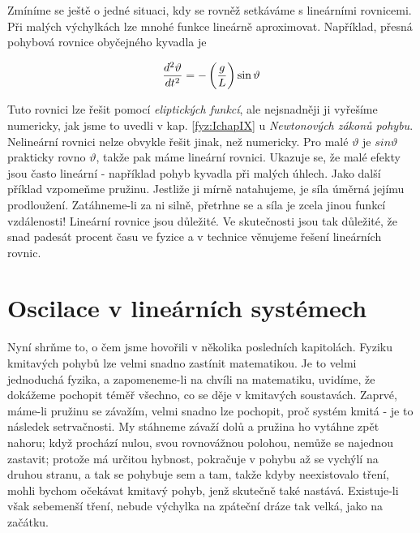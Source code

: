 {    Zmíníme se ještě o jedné situaci, kdy se rovněž setkáváme s lineárními rovnicemi. Při malých 
    výchylkách lze mnohé funkce lineárně aproximovat. Například, přesná pohybová rovnice obyčejného 
    kyvadla je
    
    \begin{equation}\label{fyz:eq346}
      \dfrac{d^2 \vartheta}{d t^2} = - \left(\dfrac{g}{L}\right)\sin\vartheta
    \end{equation}
    
    Tuto rovnici lze řešit pomocí \emph{eliptických funkcí}, ale nejsnadněji ji vyřešíme numericky, 
    jak jsme to uvedli v kap. \ref{fyz:IchapIX} u \emph{Newtonových zákonů pohybu}. Nelineární 
    rovnici nelze obvykle řešit jinak, než numericky. Pro malé \(\vartheta\) je \(sin\vartheta\) 
    prakticky rovno \(\vartheta\), takže pak máme lineární rovnici. Ukazuje se, že malé efekty jsou 
    často lineární - například pohyb kyvadla při malých úhlech. Jako další příklad vzpomeňme 
    pružinu. Jestliže ji mírně natahujeme, je síla úměrná jejímu prodloužení. Zatáhneme-li za ni 
    silně, přetrhne se a síla je zcela jinou funkcí vzdálenosti! Lineární rovnice jsou důležité. Ve 
    skutečnosti jsou tak důležité, že snad padesát procent času ve fyzice a v technice věnujeme 
    řešení lineárních rovnic.
    
  \section{Oscilace v lineárních systémech}\label{fyz:IchapXXVsecIII}
    Nyní shrňme to, o čem jsme hovořili v několika posledních kapitolách. Fyziku kmitavých pohybů 
    lze velmi snadno zastínit matematikou. Je to velmi jednoduchá fyzika, a zapomeneme-li na chvíli 
    na matematiku, uvidíme, že dokážeme pochopit téměř všechno, co se děje v kmitavých soustavách. 
    Zaprvé, máme-li pružinu se závažím, velmi snadno lze pochopit, proč systém kmitá - je to 
    následek setrvačnosti. My stáhneme závaží dolů a pružina ho vytáhne zpět nahoru; když prochází 
    nulou, svou rovnovážnou polohou, nemůže se najednou zastavit; protože má určitou hybnost, 
    pokračuje v pohybu až se vychýlí na druhou stranu, a tak se pohybuje sem a tam, takže kdyby 
    neexistovalo tření, mohli bychom očekávat kmitavý pohyb, jenž skutečně také nastává. 
    Existuje-li však sebemenší tření, nebude výchylka na zpáteční dráze tak velká, jako na začátku.
    
}
